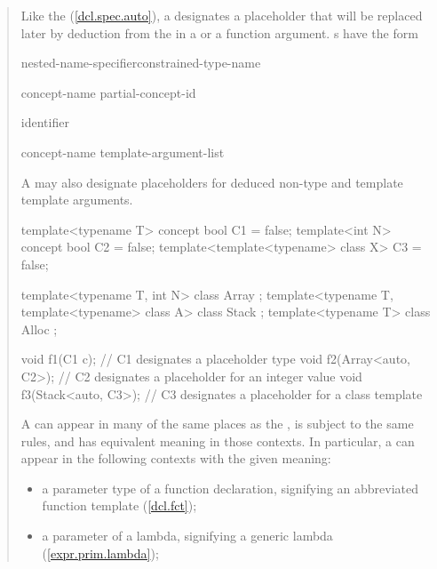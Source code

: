 \begin{quote}

\pnum
Like the   (\ref{dcl.spec.auto}),
a  designates a placeholder that 
will be replaced later by deduction from the  in a
 or a function argument.
% 
s have
the form

\begin{bnf}
\br
		nested-name-specifier\opt constrained-type-name

\br
  concept-name\br
  partial-concept-id

\br
  identifier

\br
		concept-name \terminal{<} template-argument-list\opt \terminal{>}
\end{bnf}

A 
may also designate placeholders for deduced non-type and template 
template arguments.
% 
\enterexample
\begin{codeblock}
template<typename T> concept bool C1 = false;
template<int N> concept bool C2 = false;
template<template<typename> class X> C3 = false;

template<typename T, int N> class Array { };
template<typename T, template<typename> class A> class Stack { };
template<typename T> class Alloc { };

void f1(C1 c);            // C1 designates a placeholder type
void f2(Array<auto, C2>); // C2 designates a placeholder for an integer value
void f3(Stack<auto, C3>); // C3 designates a placeholder for a class template
\end{codeblock}
\exitexample


A 
can appear in many of the same places as the 
, is subject
to the same rules, and has equivalent meaning in those contexts. 
In particular, a  
can appear in the following contexts with the given meaning:
% 
\begin{itemize}
\item a parameter type of a function declaration, signifying an 
     abbreviated function template (\ref{dcl.fct});

\item a parameter of a lambda, signifying a generic lambda 
     (\ref{expr.prim.lambda});


\end{itemize}
\end{quote}

